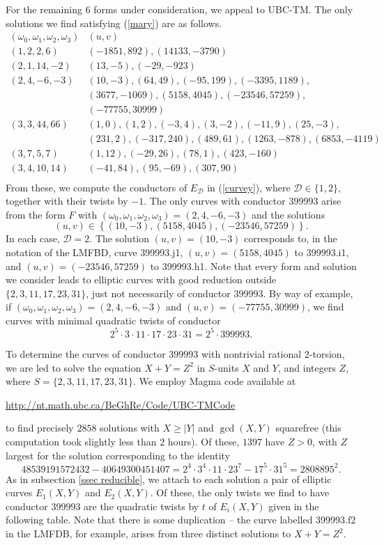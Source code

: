 For the remaining $6$ forms under consideration, we appeal to UBC-TM. The only solutions we find satisfying (\ref{mary})
are as follows.
$$
\begin{array}{c|c} 
(\omega_0,\omega_1,\omega_2,\omega_3) & (u,v) \\ \hline
(1, 2, 2, 6) & (-1851, 892), (14133, -3790) \\
(2, 1, 14, -2) & (13, -5), (-29, -923) \\
(2, 4, -6, -3) & (10,-3), (64, 49), (-95, 199), (-3395, 1189), \\
& (3677, -1069), (5158, 4045), (-23546, 57259), \\
& (-77755, 30999) \\
(3,3,44,66) & (1,0), (1,2), (-3,4), (3,-2), (-11,9), (25,-3), \\
& (231,2), (-317,240), (489,61), (1263, -878), (6853, -4119) \\
(3, 7, 5, 7) & (1, 12), (-29, 26), (78, 1),  (423, -160) \\
(3, 4, 10, 14) & (-41, 84), (95, -69), (307, 90) \\
\end{array}
$$ 
From these, we compute the conductors of $E_{\mathcal{D}}$ in (\ref{curvey}), where $\mathcal{D} \in \{ 1, 2 \}$, together with their twists by $-1$.
The only curves with conductor $399993$ arise from the form $F$ with $(\omega_0,\omega_1,\omega_2,\omega_3)=(2,4,-6,-3)$ and the solutions
$$
(u,v) \in \left\{ (10,-3), (5158,4045),  (-23546, 57259) \right\}.
$$
In each case, $\mathcal{D}=2$. The solution $(u,v)=(10,-3)$ corresponds to, in the notation of the LMFBD, curve 399993.j1, $(u,v)=(5158,4045)$ to 399993.i1, and $(u,v)=(-23546, 57259)$ to 399993.h1. Note that every form and solution we consider leads to elliptic curves with good reduction outside $\{ 2, 3, 11, 17, 23, 31 \}$, just not necessarily of  conductor $399993$. By way of example, if $(\omega_0,\omega_1,\omega_2,\omega_3) =(2, 4, -6, -3)$ and $(u,v)=(-77755, 30999)$, we find curves with minimal quadratic twists of conductor 
$$
2^5 \cdot 3 \cdot 11 \cdot 17 \cdot 23 \cdot 31 = 2^5 \cdot 399993.
$$

To determine the curves of conductor $399993$ with nontrivial rational $2$-torsion, we are led to solve the equation $X+Y=Z^2$ in $S$-units $X$ and $Y$, and integers $Z$, where $S=\{2,3,11,17,23,31 \}$.
We employ Magma code available at
\begin{center}
\url{http://nt.math.ubc.ca/BeGhRe/Code/UBC-TMCode}
\end{center}
to find precisely $2858$ solutions with $X \geq |Y|$ and  $\gcd (X,Y)$ squarefree (this computation took slightly less than $2$ hours). Of these, $1397$ have $Z > 0$, with $Z$ largest for the solution corresponding to the identity
$$
48539191572432 - 40649300451407 = 2^4 \cdot 3^4 \cdot 11 \cdot 23^7 - 17^5 \cdot 31^5 = 2808895^2.
$$
As in subsection \ref{ssec reducible}, we attach to each solution a pair of elliptic curves $E_1(X,Y)$ and $E_2(X,Y)$.
Of these, the only twists we find to have conductor $399993$ are the quadratic twists by $t$ of $E_i(X,Y)$  given in the following table. Note that there is some duplication -- the curve labelled 399993.f2 in the LMFDB, for example, arises from three distinct solutions to $X+Y=Z^2$.

